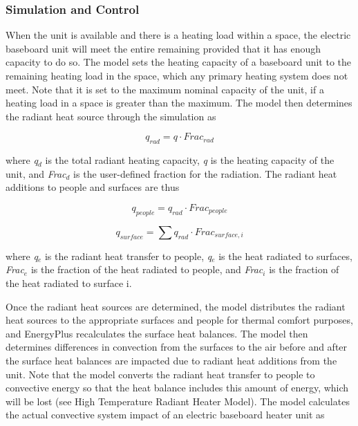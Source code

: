 \subsubsection{Simulation and Control}\label{simulation-and-control-001}

When the unit is available and there is a heating load within a space, the electric baseboard unit will meet the entire remaining provided that it has enough capacity to do so. The model sets the heating capacity of a baseboard unit to the remaining heating load in the space, which any primary heating system does not meet. Note that it is set to the maximum nominal capacity of the unit, if a heating load in a space is greater than the maximum. The model then determines the radiant heat source through the simulation as

\begin{equation}
{q_{rad}} = q \cdot Fra{c_{rad}}
\end{equation}

where \emph{q\(_{d}\)} is the total radiant heating capacity, \emph{q} is the heating capacity of the unit, and \emph{Frac\(_{d}\)} is the user-defined fraction for the radiation. The radiant heat additions to people and surfaces are thus

\begin{equation}
{q_{people}} = {q_{rad}} \cdot Fra{c_{people}}
\end{equation}

\begin{equation}
{q_{surface}} = \sum {{q_{rad}} \cdot Fra{c_{surface,i}}}
\end{equation}

where \emph{q\(_{e}\)} is the radiant heat transfer to people, \emph{q\(_{e}\)} is the heat radiated to surfaces, \emph{Frac\(_{e}\)} is the fraction of the heat radiated to people, and \emph{Frac\(_{i}\)} is the fraction of the heat radiated to surface i.

Once the radiant heat sources are determined, the model distributes the radiant heat sources to the appropriate surfaces and people for thermal comfort purposes, and EnergyPlus recalculates the surface heat balances. The model then determines differences in convection from the surfaces to the air before and after the surface heat balances are impacted due to radiant heat additions from the unit. Note that the model converts the radiant heat transfer to people to convective energy so that the heat balance includes this amount of energy, which will be lost (see High Temperature Radiant Heater Model). The model calculates the actual convective system impact of an electric baseboard heater unit as

